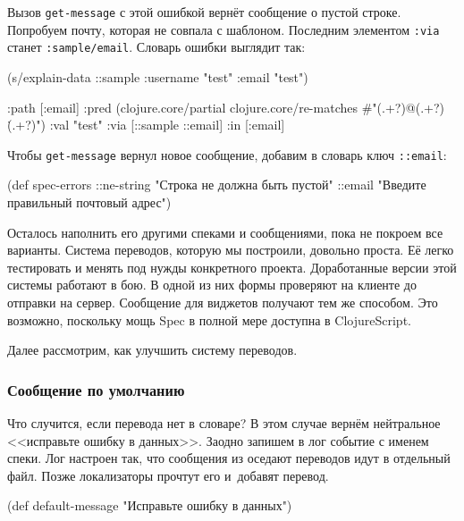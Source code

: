 Вызов \verb|get-message| с этой ошибкой вернёт сообщение о пустой
строке. Попробуем почту, которая не совпала с шаблоном. Последним элементом
\verb|:via| станет \verb|:sample/email|. Словарь ошибки выглядит так:

\begin{english}
  \begin{clojure}
(s/explain-data ::sample {:username "test" :email "test"})

{:path [:email]
 :pred
 (clojure.core/partial
  clojure.core/re-matches
  #"(.+?)@(.+?)\.(.+?)")
 :val "test"
 :via [::sample ::email]
 :in [:email]}
  \end{clojure}
\end{english}

Чтобы \verb|get-message| вернул новое сообщение, добавим в словарь ключ
\verb|::email|:

  \begin{clojure}
(def spec-errors
  {::ne-string "Строка не должна быть пустой"
   ::email "Введите правильный почтовый адрес"})
  \end{clojure}


Осталось наполнить его другими спеками и сообщениями, пока не покроем все
варианты. Система переводов, которую мы построили, довольно проста. Её легко
тестировать и менять под нужды конкретного проекта. Доработанные версии этой
системы работают в бою. В одной из них формы проверяют на клиенте до отправки на
сервер. Сообщение для виджетов получают тем же способом. Это возможно, поскольку
мощь Spec в полной мере доступна в ClojureScript.

Далее рассмотрим, как улучшить систему переводов.

\subsubsection{Сообщение по умолчанию}

Что случится, если перевода нет в словаре? В этом случае вернём нейтральное
<<исправьте ошибку в данных>>. Заодно запишем в лог событие с именем спеки. Лог
настроен так, что сообщения из оседают переводов идут в отдельный файл. Позже
локализаторы прочтут его и~добавят перевод.

  \begin{clojure}
(def default-message
  "Исправьте ошибку в данных")
  \end{clojure}

